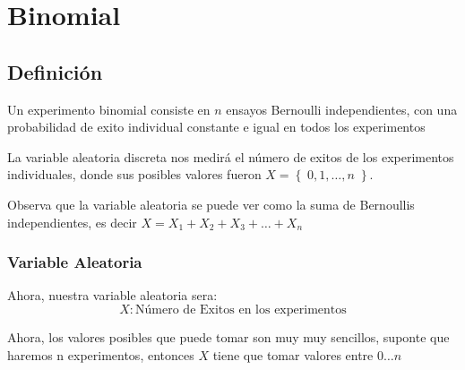 \documentclass[12pt, fleqn]{report}                             %
\theoremstyle{break}                                            %
\newcommand{\Set}[1]{\left\{ \; #1 \; \right\}}                 %
\begin{document}
        \clearpage
        \section{Binomial}

            \subsection{Definición}

                Un experimento binomial consiste en $n$ ensayos Bernoulli
                independientes, con una probabilidad de exito individual constante e igual en 
                todos los experimentos

                La variable aleatoria discreta nos medirá el número de exitos de los experimentos individuales,
                donde sus posibles valores fueron $X = \Set{0, 1, \dots, n}$.

                Observa que la variable aleatoria se puede ver como la suma de Bernoullis independientes,
                es decir $X = X_1 + X_2 + X_3 + \dots + X_n$

                \vspace{1em}
                \subsubsection{Variable Aleatoria}

                    Ahora, nuestra variable aleatoria sera:
                    \begin{equation*}
                        X : \text{Número de Exitos en los experimentos}
                    \end{equation*}

                    Ahora, los valores posibles que puede tomar son muy muy sencillos, suponte que haremos
                    n experimentos, entonces $X$ tiene que tomar valores entre $0 \dots n$
\end{document}
